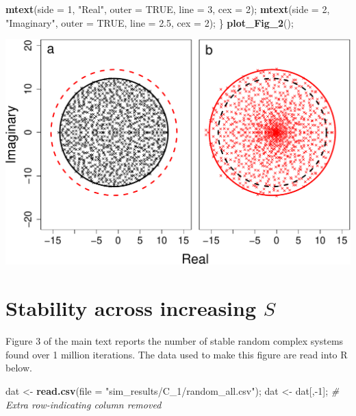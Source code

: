 \documentclass[]{article}
\newenvironment{Shaded}{\begin{snugshade}}{\end{snugshade}}
\newcommand{\KeywordTok}[1]{\textcolor[rgb]{0.13,0.29,0.53}{\textbf{{#1}}}}
\newcommand{\DataTypeTok}[1]{\textcolor[rgb]{0.13,0.29,0.53}{{#1}}}
\newcommand{\DecValTok}[1]{\textcolor[rgb]{0.00,0.00,0.81}{{#1}}}
\newcommand{\FloatTok}[1]{\textcolor[rgb]{0.00,0.00,0.81}{{#1}}}
\newcommand{\StringTok}[1]{\textcolor[rgb]{0.31,0.60,0.02}{{#1}}}
\newcommand{\CommentTok}[1]{\textcolor[rgb]{0.56,0.35,0.01}{\textit{{#1}}}}
\newcommand{\OtherTok}[1]{\textcolor[rgb]{0.56,0.35,0.01}{{#1}}}
\newcommand{\NormalTok}[1]{{#1}}
\begin{document}
\begin{Shaded}
\begin{Highlighting}[]
    \KeywordTok{mtext}\NormalTok{(}\DataTypeTok{side =} \DecValTok{1}\NormalTok{, }\StringTok{"Real"}\NormalTok{, }\DataTypeTok{outer =} \OtherTok{TRUE}\NormalTok{, }\DataTypeTok{line =} \DecValTok{3}\NormalTok{, }\DataTypeTok{cex =} \DecValTok{2}\NormalTok{);}
    \KeywordTok{mtext}\NormalTok{(}\DataTypeTok{side =} \DecValTok{2}\NormalTok{, }\StringTok{"Imaginary"}\NormalTok{, }\DataTypeTok{outer =} \OtherTok{TRUE}\NormalTok{, }\DataTypeTok{line =} \FloatTok{2.5}\NormalTok{, }\DataTypeTok{cex =} \DecValTok{2}\NormalTok{);}
\NormalTok{\}}
\KeywordTok{plot_Fig_2}\NormalTok{();}
\end{Highlighting}
\end{Shaded}

\includegraphics{SI_files/figure-latex/unnamed-chunk-8-1.pdf}

\hypertarget{IncrS}{\section{\texorpdfstring{Stability across increasing
\(S\)}{Stability across increasing S}}\label{IncrS}}

Figure 3 of the main text reports the number of stable random complex
systems found over 1 million iterations. The data used to make this
figure are read into R below.

\begin{Shaded}
\begin{Highlighting}[]
\NormalTok{dat <-}\StringTok{ }\KeywordTok{read.csv}\NormalTok{(}\DataTypeTok{file =} \StringTok{"sim_results/C_1/random_all.csv"}\NormalTok{);}
\NormalTok{dat <-}\StringTok{ }\NormalTok{dat[,-}\DecValTok{1}\NormalTok{]; }\CommentTok{# Extra row-indicating column removed}
\end{Highlighting}
\end{Shaded}
\end{document}
